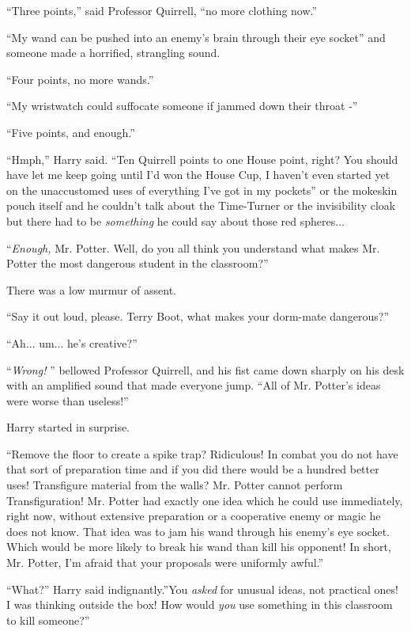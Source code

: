 ``Three points,'' said Professor Quirrell, ``no more clothing now.''

``My wand can be pushed into an enemy's brain through their eye socket''
and someone made a horrified, strangling sound.

``Four points, no more wands.''

``My wristwatch could suffocate someone if jammed down their throat -''

``Five points, and enough.''

``Hmph,'' Harry said. ``Ten Quirrell points to one House point, right?
You should have let me keep going until I'd won the House Cup, I haven't
even started yet on the unaccustomed uses of everything I've got in my
pockets'' or the mokeskin pouch itself and he couldn't talk about the
Time-Turner or the invisibility cloak but there had to be
\emph{something} he could say about those red spheres...

``\emph{Enough,} Mr. Potter. Well, do you all think you understand what
makes Mr. Potter the most dangerous student in the classroom?''

There was a low murmur of assent.

``Say it out loud, please. Terry Boot, what makes your dorm-mate
dangerous?''

``Ah... um... he's creative?''

``\emph{Wrong!} '' bellowed Professor Quirrell, and his fist came down
sharply on his desk with an amplified sound that made everyone jump.
``All of Mr. Potter's ideas were worse than useless!''

Harry started in surprise.

``Remove the floor to create a spike trap? Ridiculous! In combat you do
not have that sort of preparation time and if you did there would be a
hundred better uses! Transfigure material from the walls? Mr. Potter
cannot perform Transfiguration! Mr. Potter had exactly one idea which he
could use immediately, right now, without extensive preparation or a
cooperative enemy or magic he does not know. That idea was to jam his
wand through his enemy's eye socket. Which would be more likely to break
his wand than kill his opponent! In short, Mr. Potter, I'm afraid that
your proposals were uniformly awful.''

``What?'' Harry said indignantly.''You \emph{asked} for unusual ideas,
not practical ones! I was thinking outside the box! How would \emph{you}
use something in this classroom to kill someone?''

